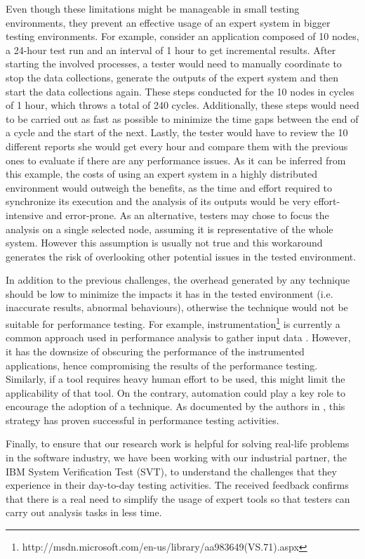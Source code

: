 \documentclass[runningheads,a4paper]{llncs}
\begin{document}
Even though these limitations might be manageable in small testing environments,
they prevent an effective usage of an expert system in bigger testing environments. For
example, consider an application composed of 10 nodes, a 24-hour test run and
an interval of 1 hour to get incremental results. After starting the involved
processes, a tester would need to manually coordinate to stop the data
collections, generate the outputs of the expert system and then start the data
collections again. These steps conducted for the 10 nodes in cycles of 1 hour,
which throws a total of 240 cycles. Additionally, these steps would need to be
carried out as fast as possible to minimize the time gaps between the end of a
cycle and the start of the next. Lastly, the tester would have to review the 10
different reports she would get every hour and compare them with the previous
ones to evaluate if there are any performance issues. As it can be inferred
from this example, the costs of using an expert system in a highly distributed
environment would outweigh the benefits, as the time and effort required to
synchronize its execution and the analysis of its outputs would be very
effort-intensive and error-prone. As an alternative, testers may chose to focus
the analysis on a single selected node, assuming it is representative of the
whole system. However this assumption is usually not true and this workaround
generates the risk of overlooking other potential issues in the tested
environment.

In addition to the previous challenges, the overhead generated by any technique
should be low to minimize the impacts it has in the tested environment (i.e.
inaccurate results, abnormal behaviours), otherwise the technique would not be
suitable for performance testing. For example,
instrumentation\footnote{http://msdn.microsoft.com/en-us/library/aa983649(VS.71).aspx}
is currently a common approach used in performance analysis to gather input data
\cite{Yang1,Hangal1,Csallner1,Chen2}. However, it has the downsize of obscuring
the performance of the instrumented applications, hence compromising the results of 
the performance testing. Similarly, if a tool requires heavy human effort to be
used, this might limit the applicability of that tool. On the contrary, automation 
could play a key role to encourage the adoption of a technique. As documented by
the authors in \cite{Shahamiri1}, this strategy has proven successful in
performance testing activities.

Finally, to ensure that our research work is helpful for solving real-life
problems in the software industry, we have been working with our industrial
partner, the IBM System Verification Test (SVT), to understand the challenges
that they experience in their day-to-day testing activities. The received
feedback confirms that there is a real need to simplify the usage of expert
tools so that testers can carry out analysis tasks in less time.
\end{document}
